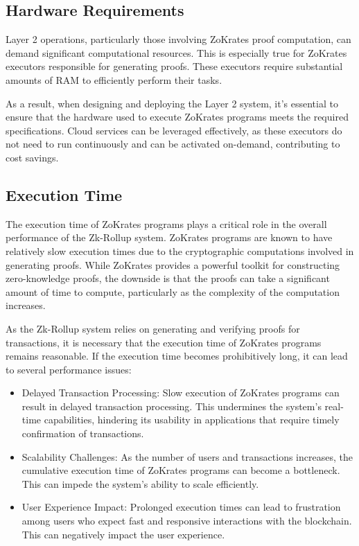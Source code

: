 \subsection{Hardware Requirements}

Layer 2 operations, particularly those involving ZoKrates proof computation, can demand significant computational resources. This is especially true for ZoKrates executors responsible for generating proofs. These executors require substantial amounts of RAM to efficiently perform their tasks.

As a result, when designing and deploying the Layer 2 system, it's essential to ensure that the hardware used to execute ZoKrates programs meets the required specifications. Cloud services can be leveraged effectively, as these executors do not need to run continuously and can be activated on-demand, contributing to cost savings.

\subsection{Execution Time}

The execution time of ZoKrates programs plays a critical role in the overall performance of the Zk-Rollup system. ZoKrates programs are known to have relatively slow execution times due to the cryptographic computations involved in generating proofs. While ZoKrates provides a powerful toolkit for constructing zero-knowledge proofs, the downside is that the proofs can take a significant amount of time to compute, particularly as the complexity of the computation increases.

As the Zk-Rollup system relies on generating and verifying proofs for transactions, it is necessary that the execution time of ZoKrates programs remains reasonable. If the execution time becomes prohibitively long, it can lead to several performance issues:

\begin{itemize}
    \item Delayed Transaction Processing: Slow execution of ZoKrates programs can result in delayed transaction processing. This undermines the system's real-time capabilities, hindering its usability in applications that require timely confirmation of transactions.
    \item Scalability Challenges: As the number of users and transactions increases, the cumulative execution time of ZoKrates programs can become a bottleneck. This can impede the system's ability to scale efficiently.
    \item User Experience Impact: Prolonged execution times can lead to frustration among users who expect fast and responsive interactions with the blockchain. This can negatively impact the user experience.
\end{itemize}

